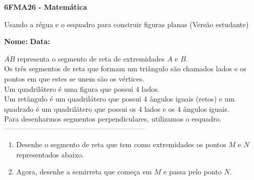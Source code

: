 \documentclass[a4paper,14pt]{article}
\begin{document}
	
	\noindent\textbf{6FMA26 - Matemática} 
	
	\begin{center}Usando a régua e o esquadro para construir figuras planas (Versão estudante)
	\end{center}
	
	\noindent\textbf{Nome:} \underline{\hspace{10cm}}
	\noindent\textbf{Data:} \underline{\hspace{4cm}}
	
	
	\begin{multicols}{2}
		\noindent $\overline{AB}$ representa o segmento de reta de extremidades $A$ e $B$. \\
		Os três segmentos de reta que formam um triângulo são chamados lados e os pontos em que estes se unem são os vértices. \\
		Um quadrilátero é uma figura que possui 4 lados. \\
		Um retângulo é um quadrilátero que possui 4 ângulos iguais (retos) e um quadrado é um quadrilátero que possui os 4 lados e os 4 ângulos iguais. \\
		Para desenharmos segmentos perpendiculares, utilizamos o esquadro.
		\\
		\noindent\textsubscript{-----------------------------------------------------------------------}
		\begin{enumerate} 
			\item Desenhe o segmento de reta que tem como extremidades os pontos $M$ e $N$ representados abaixo.
			\begin{center}
			\end{center}
			\item Agora, desenhe a semirreta que começa em $M$ e passa pelo ponto $N$.
			\begin{center}
\end{center}
\end{enumerate}
\end{multicols}
\end{document}
